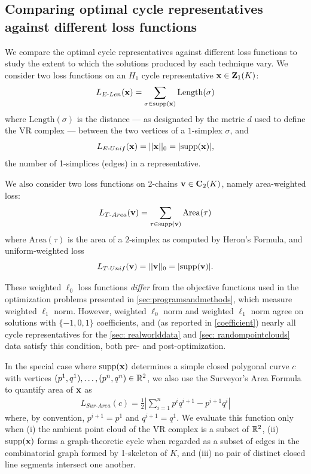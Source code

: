   
\subsection{Comparing optimal cycle representatives against different loss functions}\label{sec:comparing optimal generators against different loss functions}

We compare the optimal cycle representatives against different loss functions to study the extent to which the solutions produced by each technique vary. We consider two loss functions on an $H_1$ cycle representative $\mathbf{x} \in \mathbf{Z}_1(K)$:
$$
L_{E\text{-}Len}(\mathbf{x}) = \sum_{\sigma \in \mathrm{supp}(\mathbf{x})} \mathrm{Length}(\sigma)
$$
where $\mathrm{Length}(\sigma)$ is the distance --- as designated by the metric $d$ used to define the VR complex --- between the two vertices of a $1$-simplex $\sigma$, and
$$
L_{E\text{-}Unif}(\mathbf{x}) = ||\mathbf{x}||_0=|\mathrm{supp}(\mathbf{x})|, 
$$ 
the number of 1-simplices (edges) in a representative. 


We also consider two loss functions on 2-chains $\mathbf{v} \in \mathbf{C}_2(K)$, namely area-weighted loss:
$$
L_{T\text{-}Area}(\mathbf{v}) = \sum_{\tau \in \mathrm{supp}(\mathbf{v})} \mathrm{Area}(\tau)$$
where $\mathrm{Area}(\tau)$ is the area of a $2$-simplex as computed by Heron's Formula, and uniform-weighted loss
$$
L_{T\text{-}Unif}(\mathbf{v}) = ||\mathbf{v}||_0 = |\mathrm{supp}( \mathbf{v})|.
$$

\begin{remark}
These weighted $\ell_0$ loss functions \emph{differ} from the objective functions used in the optimization problems presented in \se \ref{sec:programsandmethods}, which measure weighted $\ell_1$ norm.  However, weighted $\ell_0$ norm and weighted $\ell_1$ norm agree on solutions with $\{-1, 0, 1\}$ coefficients, and (as reported in \se \ref{coefficient}) nearly all cycle representatives for the \se \ref{sec: realworlddata} and \ref{sec: randompointclouds} data satisfy this condition, both pre- and post-optimization.
\end{remark}

In the special case where $\mathrm{supp}(\mathbf{x})$ determines a simple closed polygonal curve $c$ with vertices $(p^1, q^1), \ldots, (p^n, q^n) \in \mathbb{R}^2$, we also use the Surveyor's Area Formula \cite{TheSurveyorsAreaFormula}  to quantify area of $\mathbf{x}$ as  
    \begin{align*}
    \textstyle
    L_{Sur\text{-}Area}(c)
    =
    \frac{1}{2}
    \left  |
        \sum_{i=1}^{n} p^i q^{i+1} - 
        p^{i+1} q^{i}
    \right |
    \end{align*}
where, by convention, $p^{i+1} = p^1$ and $q^{i+1} =  q^1$. We evaluate this function only when (i) the ambient point cloud of the VR complex is a subset of $\mathbb{R}^2$, (ii) $\mathrm{supp}(\mathbf{x})$ forms a graph-theoretic cycle when regarded as a subset of edges in the combinatorial graph formed by 1-skeleton of $K$, and (iii) no pair of distinct closed line segments intersect one another.


